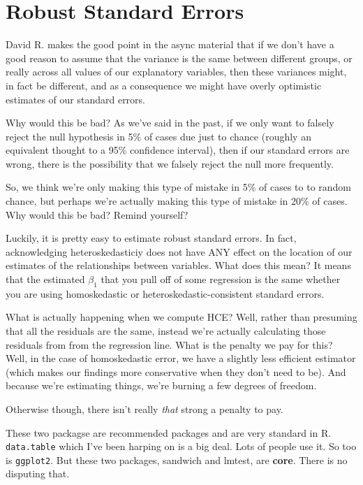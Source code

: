 \documentclass[
]{book}
\begin{document}
\hypertarget{robust-standard-errors}{%
\section{Robust Standard Errors}\label{robust-standard-errors}}

David R. makes the good point in the async material that if we don't
have a good reason to assume that the variance is the same between
different groups, or really across all values of our explanatory
variables, then these variances might, in fact be different, and as a
consequence we might have overly optimistic estimates of our standard
errors.

Why would this be bad? As we've said in the past, if we only want to
falsely reject the null hypothesis in 5\% of cases due just to chance
(roughly an equivalent thought to a 95\% confidence interval), then if
our standard errors are wrong, there is the possibility that we falsely
reject the null more frequently.

So, we think we're only making this type of mistake in 5\% of cases to
to random chance, but perhaps we're actually making this type of mistake
in 20\% of cases. Why would this be bad? Remind yourself?

Luckily, it is pretty easy to estimate robust standard errors. In fact,
acknowledging heteroskedasticiy does not have ANY effect on the location
of our estimates of the relationships between variables. What does this
mean? It means that the estimated \(\beta_{1}\) that you pull off of
some regression is the same whether you are using homoskedastic or
heteroskedastic-consistent standard errors.

What is actually happening when we compute HCE? Well, rather than
presuming that all the residuals are the same, instead we're actually
calculating those residuals from from the regression line. What is the
penalty we pay for this? Well, in the case of homoskedastic error, we
have a slightly less efficient estimator (which makes our findings more
conservative when they don't need to be). And because we're estimating
things, we're burning a few degrees of freedom.

Otherwise though, there isn't really \emph{that} strong a penalty to
pay.

These two packagse are recommended packages and are very standard in R.
\texttt{data.table} which I've been harping on is a big deal. Lots of
people use it. So too is \texttt{ggplot2}. But these two packages,
sandwich and lmtest, are \textbf{core}. There is no disputing that.
\end{document}
